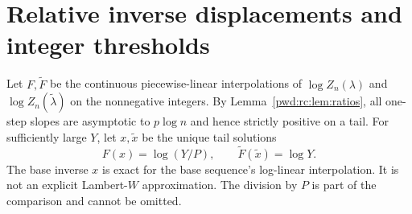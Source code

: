 \documentclass[11pt,letterpaper]{article}
\numberwithin{equation}{section}
\theoremstyle{remark}\newtheorem{remark}[theorem]{Remark}
\begin{document}
\section{Relative inverse displacements and integer thresholds}\label{pwd:rc:sec:inverse}
Let $F,\widetilde F$ be the continuous piecewise-linear interpolations of $\log Z_n(\lambda)$ and $\log Z_n(\widetilde\lambda)$ on the nonnegative integers. By Lemma~\ref{pwd:rc:lem:ratios}, all one-step slopes are asymptotic to $p\log n$ and hence strictly positive on a tail. For sufficiently large $Y$, let $x,\widetilde x$ be the unique tail solutions
\begin{equation}\label{pwd:rc:eq:inverse-def}
 F(x)=\log(Y/P),\qquad\widetilde F(\widetilde x)=\log Y.
\end{equation}
The base inverse $x$ is exact for the base sequence's log-linear interpolation. It is not an explicit Lambert-$W$ approximation. The division by $P$ is part of the comparison and cannot be omitted.
\end{document}
